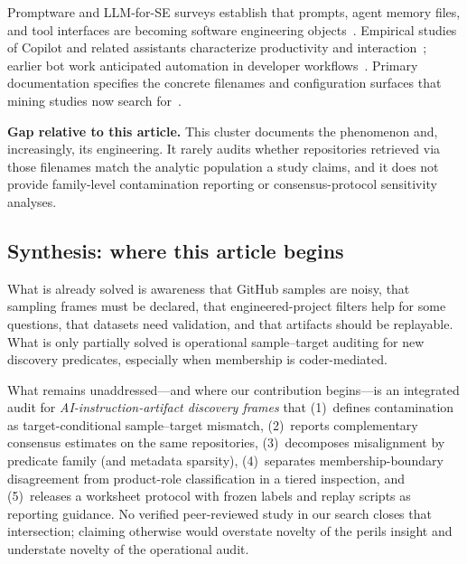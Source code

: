 Promptware and LLM-for-SE surveys establish that prompts, agent memory files, and tool interfaces are becoming software engineering objects~\cite{chen2026promptware,hou2024llm4se,fan2023llmse}.
Empirical studies of Copilot and related assistants characterize productivity and interaction~\cite{ziegler2024copilot,barke2023grounded,vaithilingam2022expectation}; earlier bot work anticipated automation in developer workflows~\cite{storey2016bots}.
Primary documentation specifies the concrete filenames and configuration surfaces that mining studies now search for~\cite{agentsmd2025,brown2024copilot,claude2024docs,cursor2024docs,anthropic2024mcp}.

\textbf{Gap relative to this article.}
This cluster documents the phenomenon and, increasingly, its engineering.
It rarely audits whether repositories retrieved via those filenames match the analytic population a study claims, and it does not provide family-level contamination reporting or consensus-protocol sensitivity analyses.

\subsection{Synthesis: where this article begins}
\label{subsec:rw-synthesis}

What is already solved is awareness that GitHub samples are noisy, that sampling frames must be declared, that engineered-project filters help for some questions, that datasets need validation, and that artifacts should be replayable.
What is only partially solved is operational sample--target auditing for new discovery predicates, especially when membership is coder-mediated.

What remains unaddressed---and where our contribution begins---is an integrated audit for \emph{AI-instruction-artifact discovery frames} that (1)~defines contamination as target-conditional sample--target mismatch, (2)~reports complementary consensus estimates on the same repositories, (3)~decomposes misalignment by predicate family (and metadata sparsity), (4)~separates membership-boundary disagreement from product-role classification in a tiered inspection, and (5)~releases a worksheet protocol with frozen labels and replay scripts as reporting guidance.
No verified peer-reviewed study in our search closes that intersection; claiming otherwise would overstate novelty of the perils insight and understate novelty of the operational audit.
